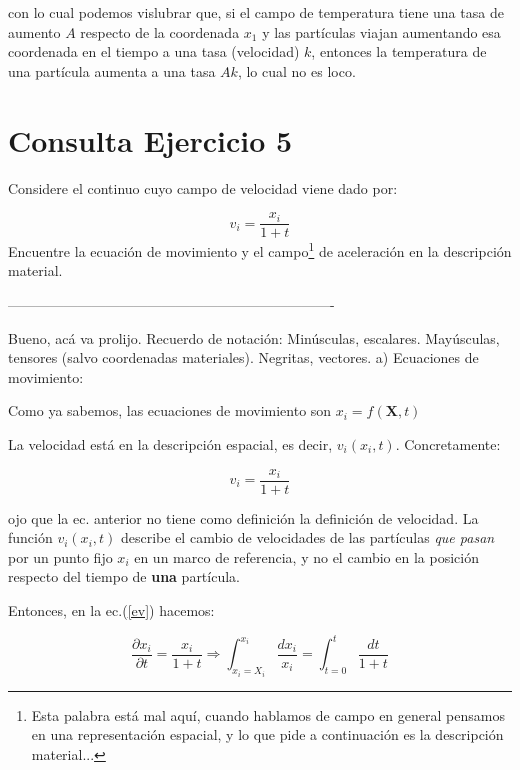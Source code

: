 \documentclass[10pt,a4paper]{article}
\theoremstyle{definition}
\begin{document}
\noindent con lo cual podemos vislubrar que, si el campo de temperatura tiene una tasa de aumento $A$ respecto de la coordenada $x_1$ y las partículas viajan aumentando esa coordenada en el tiempo a una tasa (velocidad) $k$, entonces la temperatura de una partícula aumenta a una tasa $Ak$, lo cual no es loco.



\section*{Consulta Ejercicio 5}
Considere el continuo cuyo campo de velocidad viene dado por:

\begin{equation} \nonumber
v_i=\dfrac{x_i}{1+t}
\end{equation}
\noindent Encuentre la ecuaci\'on de movimiento y el campo\footnote{Esta palabra está mal aquí, cuando hablamos de campo en general pensamos en una representación espacial, y lo que pide a continuación es la descripción material...} de aceleraci\'on en la descripci\'on material.

 ----------------------------------------------------------------------
 
Bueno, acá va prolijo. Recuerdo de notación:  Minúsculas, escalares. Mayúsculas, tensores (salvo coordenadas materiales). Negritas, vectores. 
\vspace{1cm}
a) Ecuaciones de movimiento:

Como ya sabemos, las ecuaciones de movimiento son $x_i = f(\mathbf{X}, t)$

La velocidad está en la descripción espacial, es decir,  $v_i(x_i, t)$. Concretamente:

\begin{equation}\label{ev}
v_i =\dfrac{x_i}{1+t}
\end{equation}

\noindent ojo que la ec. anterior no tiene como definición la definición de velocidad. La función $v_i(x_i, t)$ describe el cambio de velocidades de las partículas \textit{que pasan} por un punto fijo $x_i$ en un marco de referencia, y no el cambio en la posición respecto del tiempo de \textbf{una} partícula.

Entonces, en la ec.(\ref{ev}) hacemos:

\begin{equation}\label{eint}
\dfrac{\partial x_i}{\partial t} =\dfrac{x_i}{1+t} \Rightarrow \int_{x_i = X_i}^{x_i} \dfrac{dx_i}{x_i} = \int_{t = 0}^{t} \dfrac{dt}{1+t}
\end{equation}
\end{document}
